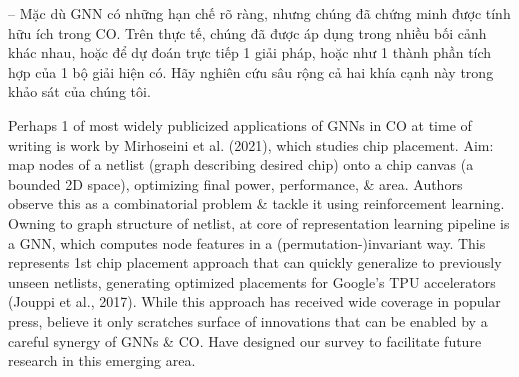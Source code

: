 \documentclass{article}
\begin{document}
\begin{itemize}
\begin{itemize}
        -- Mặc dù GNN có những hạn chế rõ ràng, nhưng chúng đã chứng minh được tính hữu ích trong CO. Trên thực tế, chúng đã được áp dụng trong nhiều bối cảnh khác nhau, hoặc để dự đoán trực tiếp 1 giải pháp, hoặc như 1 thành phần tích hợp của 1 bộ giải hiện có. Hãy nghiên cứu sâu rộng cả hai khía cạnh này trong khảo sát của chúng tôi.

        Perhaps 1 of most widely publicized applications of GNNs in CO at time of writing is work by Mirhoseini et al. (2021), which studies chip placement. Aim: map nodes of a netlist (graph describing desired chip) onto a chip canvas (a bounded 2D space), optimizing final power, performance, \& area. Authors observe this as a combinatorial problem \& tackle it using reinforcement learning. Owning to graph structure of netlist, at core of representation learning pipeline is a GNN, which computes node features in a (permutation-)invariant way. This represents 1st chip placement approach that can quickly generalize to previously unseen netlists, generating optimized placements for Google's TPU accelerators (Jouppi et al., 2017). While this approach has received wide coverage in popular press, believe it only scratches surface of innovations that can be enabled by a careful synergy of GNNs \& CO. Have designed our survey to facilitate future research in this emerging area.


\end{itemize}
\end{itemize}
\end{document}
